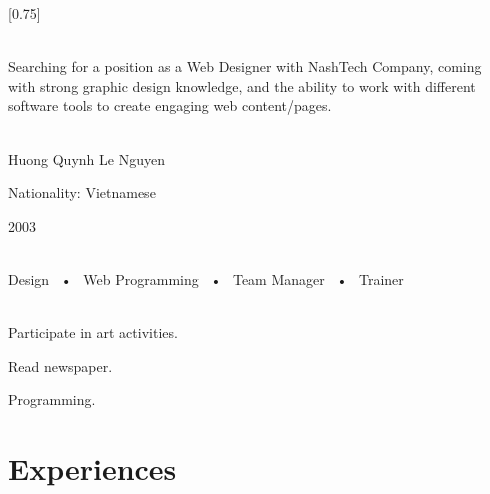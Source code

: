 \documentclass[lighthipster]{simplehipstercv}
\begin{document}
\setlength{\columnsep}{1.5cm}
[0.75]
\begin{paracol}{2}
\setlength{\columnseprule}{0.5pt}



\footnotesize
{\setasidefontcolour
\flushright
\begin{center}
\end{center}

\\[0.5em]

{\footnotesize
Searching for a position as a Web Designer with NashTech Company, coming with strong graphic design knowledge, and the ability to work with different software tools to create engaging web content/pages.}
\bigskip

 \\[0.5em]
Huong Quynh Le Nguyen

Nationality: Vietnamese 

2003

\bigskip

 \\[0.5em]

Design ~•~ Web Programming ~•~ Team Manager ~•~ Trainer

\bigskip



\bigskip

\\[0.5em]
Participate in art activities.

Read newspaper.

Programming.

\bigskip


\phantom{turn the page}

\phantom{turn the page}
}
\switchcolumn

\small
\section*{Experiences}


\end{paracol}
\end{document}
